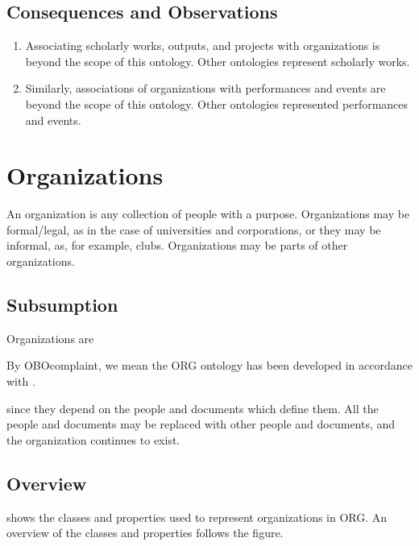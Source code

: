 \documentclass[letterpaper,10pt,english]{sphinxmanual}
\begin{document}
\section{Consequences and Observations}
\label{\detokenize{domain-definition:consequences-and-observations}}\begin{enumerate}
%
\item {} 
\sphinxAtStartPar
Associating scholarly works, outputs, and projects with organizations is beyond the
scope of this ontology.  Other ontologies represent scholarly works.

\item {} 
\sphinxAtStartPar
Similarly, associations of organizations with performances and events are beyond
the scope of this ontology.  Other ontologies represented performances and
events.

\end{enumerate}


\chapter{Organizations}
\label{\detokenize{organizations:organizations}}\label{\detokenize{organizations:id1}}\label{\detokenize{organizations::doc}}
\sphinxAtStartPar
An organization is any collection of people with a purpose.  Organizations may be
formal/legal, as in the case of universities and corporations, or they may be informal,
as, for example, clubs.  Organizations may be parts of other organizations.


\section{Subsumption}
\label{\detokenize{organizations:subsumption}}
\sphinxAtStartPar
Organizations are {\hyperref[\detokenize{glossary:glossary}]{}} %
\begin{footnote}[1]\sphinxAtStartFootnote
By OBO\sphinxhyphen{}complaint, we mean the ORG ontology has been developed in accordance with
.
%
\end{footnote} since they
depend
on the people and documents which define them. All the people and documents may be
replaced with
other people and documents, and the organization continues to exist.


\section{Overview}
\label{\detokenize{organizations:overview}}
\sphinxAtStartPar
{\hyperref[\detokenize{organizations:figure-1}]{}} shows the classes and properties used to represent organizations in ORG.
An overview of the classes and properties follows the figure.
\end{document}
